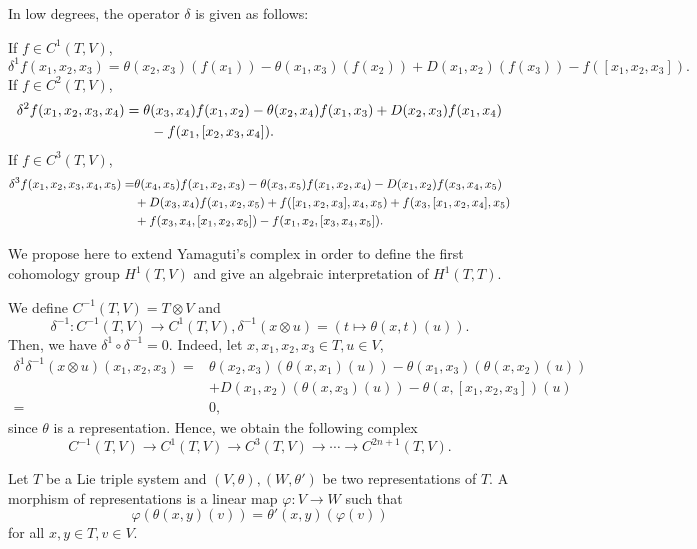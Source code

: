 \documentclass[11pt, twoside]{article}
\begin{document}
In low degrees, the operator $\delta$ is given as follows: 

If $f\in C^1(T,V)$,  \begin{equation}\label{lwo1}
    \delta^1 f(x_1,x_2,x_3)= \theta(x_2,x_3)(f(x_1))- \theta(x_1,x_3)(f(x_2))+D(x_1,x_2)(f(x_3))- f([x_1,x_2,x_3]). 
\end{equation}If $f\in C^2(T,V)$, \begin{align}
    \delta^2 f(x_1,x_2,x_3,x_4)= \theta&(x_3,x_4)f(x_1,x_2)-\theta(x_2,x_4)f(x_1,x_3)+ D(x_2,x_3)f(x_1,x_4)\notag \\&- f(x_1,[x_2,x_3,x_4]).\label{lwo2}
\end{align}  If $f\in C^3(T,V)$, \begin{align}
    \delta^3 f(x_1,x_2,x_3,x_4,x_5)=& \theta(x_4,x_5)f(x_1,x_2,x_3)-\theta(x_3,x_5)f(x_1,x_2,x_4)-D(x_1,x_2)f(x_3,x_4,x_5)\notag\\ &+ D(x_3,x_4)f(x_1,x_2,x_5)+ f([x_1,x_2,x_3],x_4,x_5)+ f(x_3,[x_1,x_2,x_4],x_5)\notag\\ &+f(x_3,x_4,[x_1,x_2,x_5])- f(x_1,x_2,[x_3,x_4,x_5]).
\end{align}

We propose here to extend  Yamaguti's complex in order to define the first cohomology group $H^1(T,V)$ and give an algebraic interpretation of $H^1(T,T) $.

We define $C^{-1}(T,V)= T\otimes V $ and $$\delta^{-1}:C^{-1}(T,V)\to C^1(T,V) ,\delta^{-1}(x\otimes u)=(t\mapsto \theta(x,t)(u)). $$ Then, we have $\delta^1\circ\delta^{-1}=0 $. Indeed, let $x,x_1,x_2,x_3\in T, u\in V$, \begin{align*}
    \delta^1\delta^{-1}(x\otimes u)(x_1,x_2,x_3)=& \theta(x_2,x_3)(\theta(x,x_1)(u))- \theta(x_1,x_3)(\theta(x,x_2)(u))\\&+D(x_1,x_2)(\theta(x,x_3)(u))- \theta(x,[x_1,x_2,x_3])(u) \\ =&0,
\end{align*} since $\theta$ is a representation. Hence, we obtain the following complex $$C^{-1}(T,V)\to C^1(T,V)\to C^3(T,V)\to \cdots \to C^{2n+1}(T,V). $$

\begin{defi}
    Let $T$ be a Lie triple system and $(V,\theta),(W,\theta')$ be two representations of $T$. A morphism of representations is a linear map $\varphi:V\to W $ such that $$\varphi(\theta(x,y)(v))= \theta'(x,y)(\varphi(v)) $$ for all $x,y\in T, v\in V$.
\end{defi}
\end{document}
